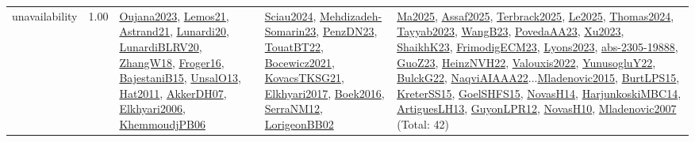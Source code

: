 {\begin{longtable}{p{3cm}r>{\raggedright\arraybackslash}p{6cm}>{\raggedright\arraybackslash}p{6cm}>{\raggedright\arraybackslash}p{8cm}}
\index{unavailability}\index{Concepts!unavailability}unavailability &  1.00 & \hyperref[detail:Oujana2023]{Oujana2023}, \hyperref[detail:Lemos21]{Lemos21}, \hyperref[detail:Astrand21]{Astrand21}, \hyperref[detail:Lunardi20]{Lunardi20}, \hyperref[detail:LunardiBLRV20]{LunardiBLRV20}, \hyperref[detail:ZhangW18]{ZhangW18}, \hyperref[detail:Froger16]{Froger16}, \hyperref[detail:BajestaniB15]{BajestaniB15}, \hyperref[detail:UnsalO13]{UnsalO13}, \hyperref[detail:Hat2011]{Hat2011}, \hyperref[detail:AkkerDH07]{AkkerDH07}, \hyperref[detail:Elkhyari2006]{Elkhyari2006}, \hyperref[detail:KhemmoudjPB06]{KhemmoudjPB06} & \hyperref[detail:Sciau2024]{Sciau2024}, \hyperref[detail:Mehdizadeh-Somarin23]{Mehdizadeh-Somarin23}, \hyperref[detail:PenzDN23]{PenzDN23}, \hyperref[detail:TouatBT22]{TouatBT22}, \hyperref[detail:Bocewicz2021]{Bocewicz2021}, \hyperref[detail:KovacsTKSG21]{KovacsTKSG21}, \hyperref[detail:Elkhyari2017]{Elkhyari2017}, \hyperref[detail:Boek2016]{Boek2016}, \hyperref[detail:SerraNM12]{SerraNM12}, \hyperref[detail:LorigeonBB02]{LorigeonBB02} & \hyperref[detail:Ma2025]{Ma2025}, \hyperref[detail:Assaf2025]{Assaf2025}, \hyperref[detail:Terbrack2025]{Terbrack2025}, \hyperref[detail:Le2025]{Le2025}, \hyperref[detail:Thomas2024]{Thomas2024}, \hyperref[detail:Tayyab2023]{Tayyab2023}, \hyperref[detail:WangB23]{WangB23}, \hyperref[detail:PovedaAA23]{PovedaAA23}, \hyperref[detail:Xu2023]{Xu2023}, \hyperref[detail:ShaikhK23]{ShaikhK23}, \hyperref[detail:FrimodigECM23]{FrimodigECM23}, \hyperref[detail:Lyons2023]{Lyons2023}, \hyperref[detail:abs-2305-19888]{abs-2305-19888}, \hyperref[detail:GuoZ23]{GuoZ23}, \hyperref[detail:HeinzNVH22]{HeinzNVH22}, \hyperref[detail:Valouxis2022]{Valouxis2022}, \hyperref[detail:YunusogluY22]{YunusogluY22}, \hyperref[detail:BulckG22]{BulckG22}, \hyperref[detail:NaqviAIAAA22]{NaqviAIAAA22}...\hyperref[detail:Mladenovic2015]{Mladenovic2015}, \hyperref[detail:BurtLPS15]{BurtLPS15}, \hyperref[detail:KreterSS15]{KreterSS15}, \hyperref[detail:GoelSHFS15]{GoelSHFS15}, \hyperref[detail:NovasH14]{NovasH14}, \hyperref[detail:HarjunkoskiMBC14]{HarjunkoskiMBC14}, \hyperref[detail:ArtiguesLH13]{ArtiguesLH13}, \hyperref[detail:GuyonLPR12]{GuyonLPR12}, \hyperref[detail:NovasH10]{NovasH10}, \hyperref[detail:Mladenovic2007]{Mladenovic2007} (Total: 42)\\
\end{longtable}
}

\clearpage
